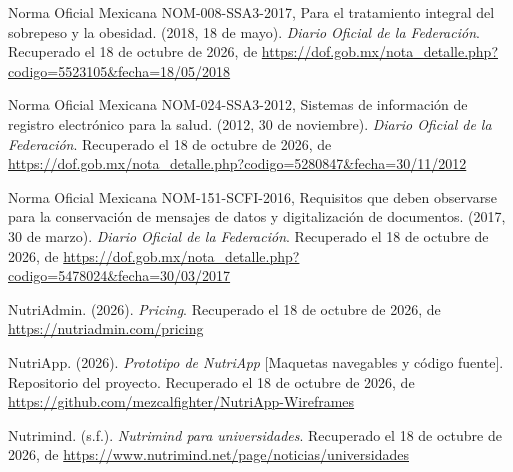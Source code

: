 \documentclass[12pt, a4paper]{article}
\begin{document}
\begin{list}{}{\setlength{\leftmargin}{1.27cm}\setlength{\itemindent}{-1.27cm}%
  \setlength{\labelwidth}{0pt}\setlength{\labelsep}{0pt}\setlength{\itemsep}{6pt}}
\item Norma Oficial Mexicana NOM-008-SSA3-2017, Para el tratamiento
  integral del sobrepeso y la obesidad. (2018, 18 de mayo).
  \textit{Diario Oficial de la Federación}.
  Recuperado el 18 de octubre de 2026, de \url{https://dof.gob.mx/nota_detalle.php?codigo=5523105&fecha=18/05/2018}


\item Norma Oficial Mexicana NOM-024-SSA3-2012, Sistemas de
  información de registro electrónico para la salud. (2012,
  30 de noviembre). \textit{Diario Oficial de la Federación}.
  Recuperado el 18 de octubre de 2026, de \url{https://dof.gob.mx/nota_detalle.php?codigo=5280847&fecha=30/11/2012}

  
\item Norma Oficial Mexicana NOM-151-SCFI-2016, Requisitos que deben
  observarse para la conservación de mensajes de datos y
  digitalización de documentos. (2017, 30 de marzo). \textit{Diario
  Oficial de la Federación}.
  Recuperado el 18 de octubre de 2026, de \url{https://dof.gob.mx/nota_detalle.php?codigo=5478024&fecha=30/03/2017}
 

\item NutriAdmin. (2026). \textit{Pricing}.
  Recuperado el 18 de octubre de 2026, de \url{https://nutriadmin.com/pricing}
 
\item NutriApp. (2026). \textit{Prototipo de NutriApp} [Maquetas
  navegables y código fuente]. Repositorio del proyecto.
  Recuperado el 18 de octubre de 2026, de \url{https://github.com/mezcalfighter/NutriApp-Wireframes}
 
 
\item Nutrimind. (s.f.). \textit{Nutrimind para universidades}. Recuperado el 18 de octubre de 2026, de \url{https://www.nutrimind.net/page/noticias/universidades}
 

\end{list}
\end{document}
